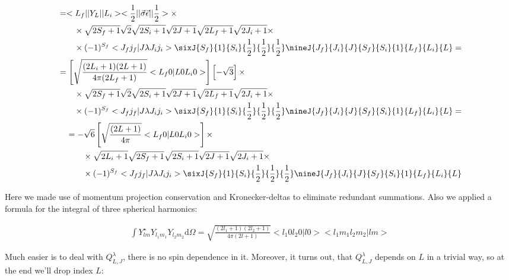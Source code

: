 \begin{align}
    \begin{split}
        &= <L_f|| Y_L ||L_i> <\frac{1}{2}|| \vec{\sigma}\vec{\epsilon} ||\frac{1}{2}> \times \\
        &\qquad\times \sqrt{2S_f+1} \sqrt{2} \sqrt{2S_i + 1} \sqrt{2J+1} \sqrt{2L_f+1} \sqrt{2J_i+1} \times \\
        &\qquad\times (-1)^{S_f} <J_f j_f| J \lambda J_i j_i> \sixJ{S_f}{1}{S_i}{\frac{1}{2}}{\frac{1}{2}}{\frac{1}{2}} \nineJ{J_f}{J_i}{J}{S_f}{S_i}{1}{L_f}{L_i}{L} =
    \end{split}\\
    \begin{split}
        &= \left[ \sqrt{\frac{(2L_i+1)(2L+1)}{4\pi (2L_f+1)}} <L_f 0 | L 0 L_i 0> \right] \left[ -\sqrt{3} \right] \times \\
        &\qquad\times \sqrt{2S_f+1} \sqrt{2} \sqrt{2S_i + 1} \sqrt{2J+1} \sqrt{2L_f+1} \sqrt{2J_i+1} \times \\
        &\qquad\times (-1)^{S_f} <J_f j_f| J \lambda J_i j_i> \sixJ{S_f}{1}{S_i}{\frac{1}{2}}{\frac{1}{2}}{\frac{1}{2}} \nineJ{J_f}{J_i}{J}{S_f}{S_i}{1}{L_f}{L_i}{L} =
    \end{split}\\
    \begin{split}
        &= -\sqrt{6} \left[ \sqrt{\frac{(2L+1)}{4\pi}} <L_f 0 | L 0 L_i 0> \right] \times \\
        &\qquad\times \sqrt{2L_i+1} \sqrt{2S_f+1} \sqrt{2S_i + 1} \sqrt{2J+1} \sqrt{2J_i+1} \times \\
        &\qquad\times (-1)^{S_f} <J_f j_f| J \lambda J_i j_i> \sixJ{S_f}{1}{S_i}{\frac{1}{2}}{\frac{1}{2}}{\frac{1}{2}} \nineJ{J_f}{J_i}{J}{S_f}{S_i}{1}{L_f}{L_i}{L}
    \end{split}
\end{align}

Here we made use of momentum projection conservation and Kronecker-deltas to eliminate redundant summations. Also we applied a formula for the integral of three spherical harmonics:

\begin{align}
    \int Y^{\star}_{l m} Y_{l_1 m_1} Y_{l_2 m_2} \mathrm{d} \Omega = \sqrt{\frac{(2l_1+1)(2l_2+1)}{4 \pi (2l+1)}} <l_1 0 l_2 0 | l 0> <l_1 m_1 l_2 m_2 | l m>
\end{align}

Much easier is to deal with $Q_{L, J}^\lambda$, there is no spin dependence in it. Moreover, it turns out, that $Q_{L, J}^{\lambda}$ depends on $L$ in a trivial way, so at the end we'll drop index $L$:


